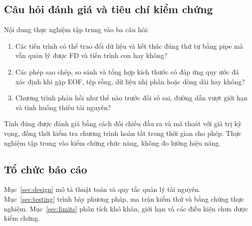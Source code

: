 \documentclass[12pt,a4paper]{article}
\begin{document}
\subsection{Câu hỏi đánh giá và tiêu chí kiểm chứng}
Nội dung thực nghiệm tập trung vào ba câu hỏi:
\begin{enumerate}[label=\textbf{RQ\arabic*.},leftmargin=2.8em]
\item Các tiến trình có thể trao đổi dữ liệu và kết thúc đúng thứ tự bằng pipe mà vẫn quản lý được FD và tiến trình con hay không?
\item Các phép sao chép, so sánh và tổng hợp kích thước có đáp ứng quy ước đã xác định khi gặp EOF, tệp rỗng, dữ liệu nhị phân hoặc dòng dài hay không?
\item Chương trình phản hồi như thế nào trước đối số sai, đường dẫn vượt giới hạn và tình huống thiếu tài nguyên?
\end{enumerate}
Tính đúng được đánh giá bằng cách đối chiếu đầu ra và mã thoát với giá trị kỳ vọng, đồng thời kiểm tra chương trình hoàn tất trong thời gian cho phép. Thực nghiệm tập trung vào kiểm chứng chức năng, không đo lường hiệu năng.

\subsection{Tổ chức báo cáo}
Mục~\ref{sec:design} mô tả thuật toán và quy tắc quản lý tài nguyên. Mục~\ref{sec:testing} trình bày phương pháp, ma trận kiểm thử và bằng chứng thực nghiệm. Mục~\ref{sec:limits} phân tích khó khăn, giới hạn và các điều kiện chưa được kiểm chứng.

\clearpage
\end{document}
